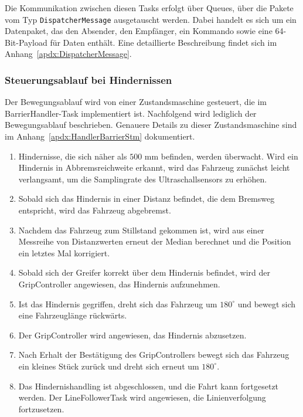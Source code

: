 \documentclass[main.tex]{subfiles} %
\begin{document}
Die Kommunikation zwischen diesen Tasks erfolgt über Queues, über die Pakete
vom Typ \texttt{DispatcherMessage} ausgetauscht werden. Dabei handelt es sich
um ein Datenpaket, das den Absender, den Empfänger, ein Kommando sowie eine
64-Bit-Payload für Daten enthält. Eine detaillierte Beschreibung findet sich im
Anhang~\ref{apdx:DispatcherMessage}.

\subsubsection*{Steuerungsablauf bei Hindernissen}

Der Bewegungsablauf wird von einer Zustandsmaschine gesteuert, die im
BarrierHandler-Task implementiert ist. Nachfolgend wird lediglich der
Bewegungsablauf beschrieben. Genauere Details zu dieser Zustandsmaschine sind
im Anhang~\ref{apdx:HandlerBarrierStm} dokumentiert.

\begin{enumerate}
    \item Hindernisse, die sich näher als $500$ mm befinden, werden überwacht. Wird ein
          Hindernis in Abbremsreichweite erkannt, wird das Fahrzeug zunächst leicht
          verlangsamt, um die Samplingrate des Ultraschallsensors zu erhöhen.

    \item Sobald sich das Hindernis in einer Distanz befindet, die dem Bremsweg
          entspricht, wird das Fahrzeug abgebremst.

    \item Nachdem das Fahrzeug zum Stillstand gekommen ist, wird aus einer Messreihe von
          Distanzwerten erneut der Median berechnet und die Position ein letztes Mal
          korrigiert.

    \item Sobald sich der Greifer korrekt über dem Hindernis befindet, wird der
          GripController angewiesen, das Hindernis aufzunehmen.

    \item Ist das Hindernis gegriffen, dreht sich das Fahrzeug um $180^\circ$ und bewegt
          sich eine Fahrzeuglänge rückwärts.

    \item Der GripController wird angewiesen, das Hindernis abzusetzen.

    \item Nach Erhalt der Bestätigung des GripControllers bewegt sich das Fahrzeug ein
          kleines Stück zurück und dreht sich erneut um $180^\circ$.

    \item Das Hindernishandling ist abgeschlossen, und die Fahrt kann fortgesetzt werden.
          Der LineFollowerTask wird angewiesen, die Linienverfolgung fortzusetzen.
\end{enumerate}
\end{document}
